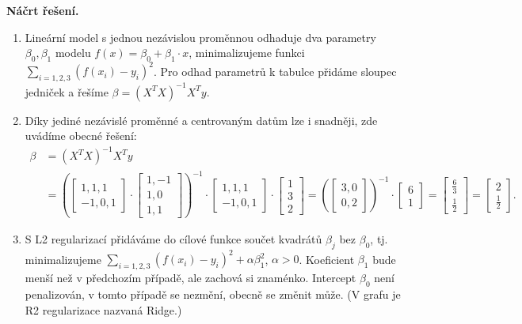 \medskip
\noindent\textbf{Náčrt řešení.}\par
\begin{enumerate}
  \item Lineární model s jednou nezávislou proměnnou odhaduje dva parametry $\beta_0, \beta_1$
    modelu $f(x) = \beta_0 + \beta_1 \cdot x$, minimalizujeme funkci
    $\sum_{i=1,2,3} (f(x_i) - y_i)^2$. Pro odhad parametrů k tabulce přidáme sloupec jedniček
    a řešíme $\beta = (X^T X)^{-1} X^T y$.
  \item Díky jediné nezávislé proměnné a centrovaným datům lze i snadněji, zde uvádíme obecné řešení:
    \begin{align*}
      \beta &= (X^T X)^{-1} X^T y \\
            &= \left( \begin{bmatrix} 1,1,1 \\ -1,0,1 \end{bmatrix} \cdot
               \begin{bmatrix} 1,-1 \\ 1,0 \\ 1,1 \end{bmatrix} \right)^{-1} \cdot
               \begin{bmatrix} 1,1,1 \\ -1,0,1 \end{bmatrix} \cdot
               \begin{bmatrix} 1 \\ 3 \\ 2 \end{bmatrix}
             = \left( \begin{bmatrix} 3,0 \\ 0,2 \end{bmatrix} \right)^{-1} \cdot
               \begin{bmatrix} 6 \\ 1 \end{bmatrix}
             = \begin{bmatrix} \frac{6}{3} \\ \frac{1}{2} \end{bmatrix}
             = \begin{bmatrix} 2 \\ \frac{1}{2} \end{bmatrix}.
    \end{align*}
  \item S L2 regularizací přidáváme do cílové funkce součet kvadrátů $\beta_j$ bez $\beta_0$, tj.
    minimalizujeme $\sum_{i=1,2,3} (f(x_i) - y_i)^2 + \alpha \beta_1^2$, $\alpha > 0$. Koeficient
    $\beta_1$ bude menší než v předchozím případě, ale zachová si znaménko. Intercept $\beta_0$
    není penalizován, v tomto případě se nezmění, obecně se změnit může. (V grafu je R2 regularizace
    nazvaná Ridge.)
\end{enumerate}

